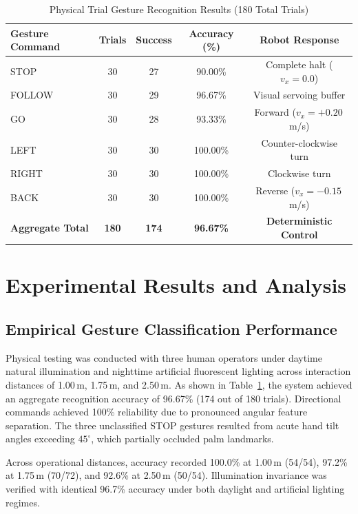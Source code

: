 \documentclass[conference]{IEEEtran}
\begin{document}
\begin{table}[t]
\centering
\caption{Physical Trial Gesture Recognition Results (180 Total Trials)}
\label{tab:physical_trials}
\begin{tabular}{lcccc}
\toprule
\textbf{Gesture Command} & \textbf{Trials} & \textbf{Success} & \textbf{Accuracy (\%)} & \textbf{Robot Response} \\
\midrule
STOP   & 30 & 27 & 90.00\% & Complete halt ($v_x=0.0$) \\
FOLLOW & 30 & 29 & 96.67\% & Visual servoing buffer \\
GO     & 30 & 28 & 93.33\% & Forward ($v_x=+0.20$\,m/s) \\
LEFT   & 30 & 30 & 100.00\% & Counter-clockwise turn \\
RIGHT  & 30 & 30 & 100.00\% & Clockwise turn \\
BACK   & 30 & 30 & 100.00\% & Reverse ($v_x=-0.15$\,m/s) \\
\midrule
\textbf{Aggregate Total} & \textbf{180} & \textbf{174} & \textbf{96.67\%} & \textbf{Deterministic Control} \\
\bottomrule
\end{tabular}
\end{table}

\section{Experimental Results and Analysis}

\subsection{Empirical Gesture Classification Performance}
Physical testing was conducted with three human operators under daytime natural illumination and nighttime artificial fluorescent lighting across interaction distances of 1.00\,m, 1.75\,m, and 2.50\,m. As shown in Table~\ref{tab:physical_trials}, the system achieved an aggregate recognition accuracy of 96.67\% (174 out of 180 trials). Directional commands achieved 100\% reliability due to pronounced angular feature separation. The three unclassified STOP gestures resulted from acute hand tilt angles exceeding $45^\circ$, which partially occluded palm landmarks.

Across operational distances, accuracy recorded 100.0\% at 1.00\,m (54/54), 97.2\% at 1.75\,m (70/72), and 92.6\% at 2.50\,m (50/54). Illumination invariance was verified with identical 96.7\% accuracy under both daylight and artificial lighting regimes.
\end{document}
